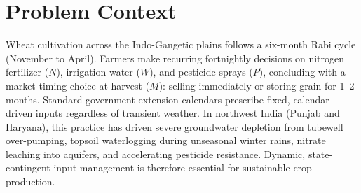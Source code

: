 \documentclass[10pt,twocolumn]{article}
\begin{document}
\fontsize{9.3pt}{11.3pt}\selectfont


\section{Problem Context}
Wheat cultivation across the Indo-Gangetic plains follows a six-month Rabi cycle (November to April). Farmers make recurring fortnightly decisions on nitrogen fertilizer ($N$), irrigation water ($W$), and pesticide sprays ($P$), concluding with a market timing choice at harvest ($M$): selling immediately or storing grain for 1--2 months. Standard government extension calendars prescribe fixed, calendar-driven inputs regardless of transient weather. In northwest India (Punjab and Haryana), this practice has driven severe groundwater depletion from tubewell over-pumping, topsoil waterlogging during unseasonal winter rains, nitrate leaching into aquifers, and accelerating pesticide resistance. Dynamic, state-contingent input management is therefore essential for sustainable crop production.

\end{document}
